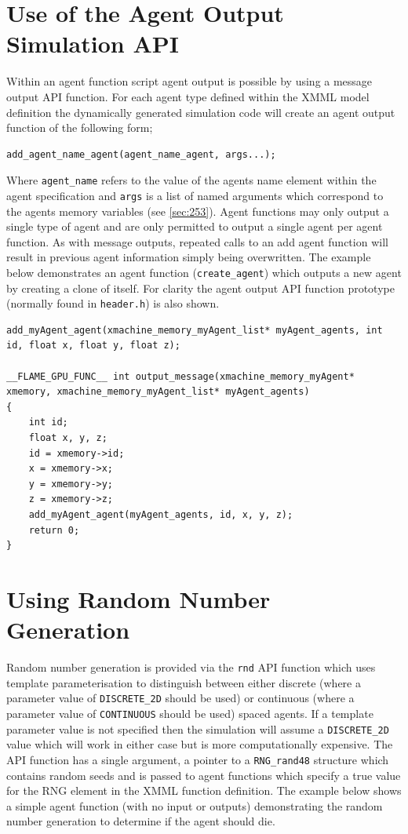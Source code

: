 \documentclass[11pt, a4paper, onecolumn, oneside]{report}
\begin{document}
\section{Use of the Agent Output Simulation API}
\label{sec:36}

Within an agent function script agent output is possible by using a message output API function.
For each agent type defined within the XMML model definition the dynamically generated simulation code will create an agent output function of the following form; 
\begin{verbatim}
add_agent_name_agent(agent_name_agent, args...);
\end{verbatim}

Where \verb|agent_name| refers to the value of the agents name element within the agent specification and \verb|args| is a list of named arguments which correspond to the agents memory variables (see \cref{sec:253}).
Agent functions may only output a single type of agent and are only permitted to output a single agent per agent function.
As with message outputs, repeated calls to an add agent function will result in previous agent information simply being overwritten.
The example below demonstrates an agent function (\verb|create_agent|) which outputs a new agent by creating a clone of itself.
For clarity the agent output API function prototype (normally found in \verb|header.h|) is also shown.

\begin{lstlisting}[language=C_]
add_myAgent_agent(xmachine_memory_myAgent_list* myAgent_agents, int id, float x, float y, float z);

__FLAME_GPU_FUNC__ int output_message(xmachine_memory_myAgent* xmemory, xmachine_memory_myAgent_list* myAgent_agents)
{
    int id;
    float x, y, z;
    id = xmemory->id;
    x = xmemory->x;
    y = xmemory->y;
    z = xmemory->z;
    add_myAgent_agent(myAgent_agents, id, x, y, z);
    return 0;
}
\end{lstlisting}


\section{Using Random Number Generation}
\label{sec:37}


Random number generation is provided via the \verb|rnd| API function which uses template parameterisation to distinguish between either discrete (where a parameter value of \verb|DISCRETE_2D| should be used) or continuous (where a parameter value of \verb|CONTINUOUS| should be used) spaced agents.
If a template parameter value is not specified then the simulation will assume a \verb|DISCRETE_2D| value which will work in either case but is more computationally expensive.
The API function has a single argument, a pointer to a \verb|RNG_rand48| structure which contains random seeds and is passed to agent functions which specify a true value for the RNG element in the XMML function definition.
The example below shows a simple agent function (with no input or outputs) demonstrating the random number generation to determine if the agent should die.
\end{document}
